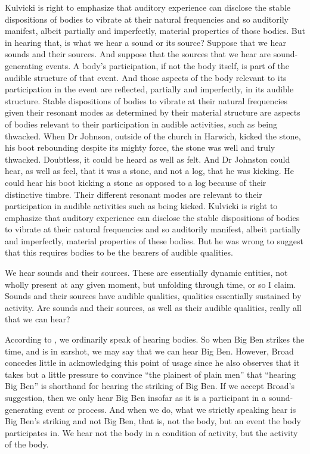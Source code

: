 \documentclass[12pt]{article}
\begin{document}
Kulvicki is right to emphasize that auditory experience can disclose the stable dispositions of bodies to vibrate at their natural frequencies and so auditorily manifest, albeit partially and imperfectly, material properties of those bodies. But in hearing that, is what we hear a sound or its source? Suppose that we hear sounds and their sources. And suppose that the sources that we hear are sound-generating events. A body’s participation, if not the body itself, is part of the audible structure of that event. And those aspects of the body relevant to its participation in the event are reflected, partially and imperfectly, in its audible structure. Stable dispositions of bodies to vibrate at their natural frequencies given their resonant modes as determined by their material structure are aspects of bodies relevant to their participation in audible activities, such as being thwacked. When Dr Johnson, outside of the church in Harwich, kicked the stone, his boot rebounding despite its mighty force, the stone was well and truly thwacked. Doubtless, it could be heard as well as felt. And Dr Johnston could hear, as well as feel, that it was a stone, and not a log, that he was kicking. He could hear his boot kicking a stone as opposed to a log because of their distinctive timbre. Their different resonant modes are relevant to their participation in audible activities such as being kicked. Kulvicki is right to emphasize that auditory experience can disclose the stable dispositions of bodies to vibrate at their natural frequencies and so auditorily manifest, albeit partially and imperfectly, material properties of these bodies. But he was wrong to suggest that this requires bodies to be the bearers of audible qualities. 

We hear sounds and their sources. These are essentially dynamic entities, not wholly present at any given moment, but unfolding through time, or so I claim. Sounds and their sources have audible qualities, qualities essentially sustained by activity. Are sounds and their sources, as well as their audible qualities, really all that we can hear?

According to \citet[4]{Broad:1952kx}, we ordinarily speak of hearing bodies. So when Big Ben strikes the time, and is in earshot, we may say that we can hear Big Ben. However, Broad concedes little in acknowledging this point of usage since he also observes that it takes but a little pressure to convince “the plainest of plain men” that “hearing Big Ben” is shorthand for hearing the striking of Big Ben. If we accept Broad’s suggestion, then we only hear Big Ben insofar as it is a participant in a sound-generating event or process. And when we do, what we strictly speaking hear is Big Ben’s striking and not Big Ben, that is, not the body, but an event the body participates in. We hear not the body in a condition of activity, but the activity of the body.
\end{document}
